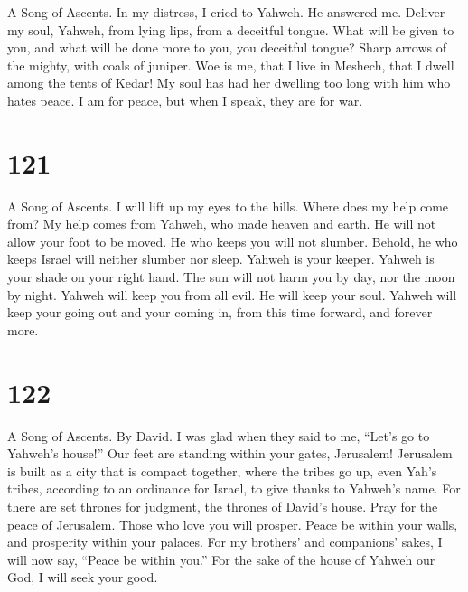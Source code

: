 A Song of Ascents.  In my distress, I cried to Yahweh. He
answered me.  Deliver my soul, Yahweh, from lying lips, from
a deceitful tongue.  What will be given to you, and what
will be done more to you, you deceitful tongue?  Sharp
arrows of the mighty, with coals of juniper.  Woe is me,
that I live in Meshech, that I dwell among the tents of Kedar!
 My soul has had her dwelling too long with him who hates
peace.  I am for peace, but when I speak, they are for war.

\hypertarget{section-111}{%
\section{121}\label{section-111}}

A Song of Ascents.  I will lift up my eyes to the hills.
Where does my help come from?  My help comes from Yahweh,
who made heaven and earth.  He will not allow your foot to
be moved. He who keeps you will not slumber.  Behold, he who
keeps Israel will neither slumber nor sleep.  Yahweh is your
keeper. Yahweh is your shade on your right hand.  The sun
will not harm you by day, nor the moon by night.  Yahweh
will keep you from all evil. He will keep your soul.  Yahweh
will keep your going out and your coming in, from this time forward, and
forever more.

\hypertarget{section-112}{%
\section{122}\label{section-112}}

A Song of Ascents. By David.  I was glad when they said to
me, ``Let's go to Yahweh's house!''  Our feet are standing
within your gates, Jerusalem!  Jerusalem is built as a city
that is compact together,  where the tribes go up, even
Yah's tribes, according to an ordinance for Israel, to give thanks to
Yahweh's name.  For there are set thrones for judgment, the
thrones of David's house.  Pray for the peace of Jerusalem.
Those who love you will prosper.  Peace be within your
walls, and prosperity within your palaces.  For my brothers'
and companions' sakes, I will now say, ``Peace be within you.''
 For the sake of the house of Yahweh our God, I will seek
your good.

